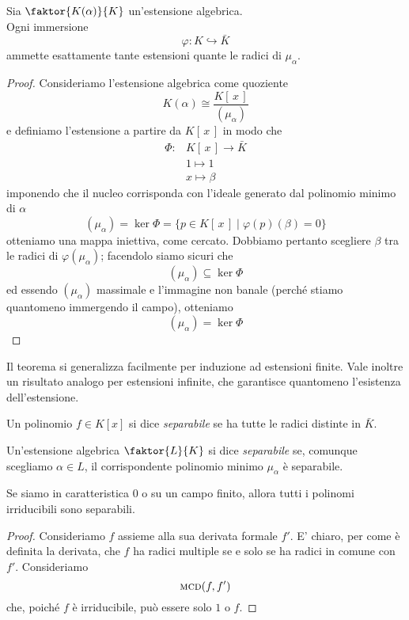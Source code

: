 \begin{multicols}{2}
	
	\begin{theorem}\label{est}
		Sia $ \faktor{K(\alpha)}{K} $ un'estensione algebrica.\\ Ogni immersione
		\[ \varphi: K \hookrightarrow \bar{K} \]
		ammette esattamente tante estensioni quante le radici di $ \mu_\alpha $.
	\end{theorem}
	\begin{proof}
		Consideriamo l'estensione algebrica come quoziente
		\[ K(\alpha) \cong \frac{K[\, x \,]}{(\mu_\alpha)} \]
		e definiamo l'estensione a partire da $ K[\, x \,] $ in modo che
		\begin{align*}
		\Phi\colon &K[\, x \,] \to \bar{K} \\
		& 1 \mapsto 1 \\
		& x \mapsto \beta 
		\end{align*}
		imponendo che il nucleo corrisponda con l'ideale generato dal polinomio minimo di $ \alpha $
		\[ (\mu_\alpha) = \ker{\Phi} = \{ p \in K[\, x \,] \mid \varphi(p)(\beta) = 0 \} \]
		otteniamo una mappa iniettiva, come cercato.
		Dobbiamo pertanto scegliere $ \beta $ tra le radici di $ \varphi(\mu_\alpha) $; facendolo siamo sicuri che
		\[ (\mu_\alpha) \subseteq \ker{\Phi} \]
		ed essendo $ (\mu_\alpha) $ massimale e l'immagine non banale (perché stiamo quantomeno immergendo il campo), otteniamo
		\[ (\mu_\alpha) = \ker{\Phi} \]
	\end{proof}
	\begin{remark}
		Il teorema si generalizza facilmente per induzione ad estensioni finite. Vale inoltre un risultato analogo per estensioni infinite, che garantisce quantomeno l'esistenza dell'estensione.
	\end{remark}


	\begin{definition}[Separabile]
		Un polinomio $ f \in K[x] $ si dice \emph{separabile} se ha tutte le radici distinte in $ \bar{K} $.
		
		Un'estensione algebrica $ \faktor{L}{K} $ si dice \emph{separabile} se, comunque scegliamo $\alpha \in L  $, il corrispondente polinomio minimo $ \mu_\alpha $ è separabile.
	\end{definition}

\begin{theorem}
	Se siamo in caratteristica $ 0 $ o su un campo finito, allora tutti i polinomi irriducibili sono separabili.
\end{theorem}
\begin{proof}
	Consideriamo $ f $ assieme alla sua derivata formale $ f' $. E' chiaro, per come è definita la derivata, che $ f $ ha radici multiple se e solo se ha radici in comune con $ f' $. Consideriamo
	$$  \textsc{mcd}(f, f')  $$
	che, poiché $ f $ è irriducibile, può essere solo $ 1 $ o $ f $.
	

\end{proof}
\end{multicols}
